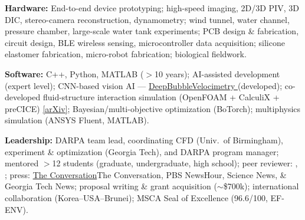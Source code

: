 \vspace{2.5mm}
\begin{cvitems}
  \item \textbf{Hardware:}
        End-to-end device prototyping;
        high-speed imaging, 2D/3D PIV, 3D DIC, stereo-camera reconstruction, dynamometry;
        wind tunnel, water channel, pressure chamber, large-scale water tank experiments;
        PCB design \& fabrication, circuit design, BLE wireless sensing, microcontroller data acquisition;
        silicone elastomer fabrication, micro-robot fabrication; biological fieldwork.
  \item \textbf{Software:}
        C++, Python, MATLAB ($>$10 years); AI-assisted development (expert level);
        CNN-based vision AI ---
        \href{https://github.com/dae416/DeepBubbleVelocimetry}{DeepBubbleVelocimetry } (developed);
        co-developed fluid-structure interaction simulation (OpenFOAM + CalculiX + preCICE)
        \ifshowcontent\href{https://arxiv.org/abs/2605.17319}{[arXiv]}\fi;
        Bayesian/multi-objective optimization (BoTorch);
        multiphysics simulation (ANSYS Fluent, MATLAB).
  \item \textbf{Leadership:}
        DARPA team lead, coordinating CFD (Univ.\ of Birmingham), experiment \& optimization (Georgia Tech), and DARPA program manager;
        mentored $>$12 students (graduate, undergraduate, high school);
        peer reviewer: \jfm, \pof;
        press: \ifshowcontent\href{https://theconversation.com/manu-jumping-the-physics-behind-making-humongous-splashes-in-the-pool-255837}{The Conversation}\else The Conversation\fi,
        PBS NewsHour, Science News, \& Georgia Tech News;
        proposal writing \& grant acquisition ($\sim$\$700k);
        international collaboration (Korea--USA--Brunei);
        MSCA Seal of Excellence (96.6/100, EF-ENV).
\end{cvitems}
